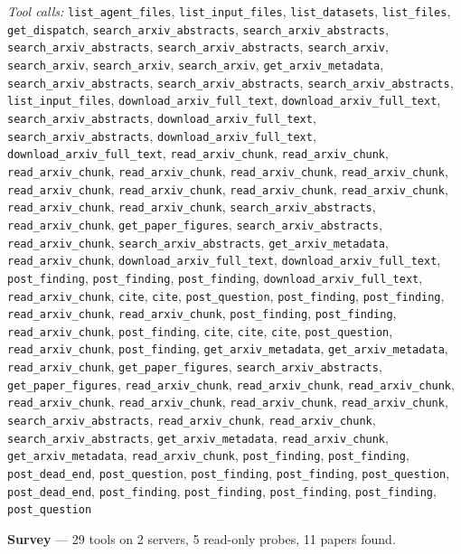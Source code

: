 \documentclass[11pt,a4paper]{article}
\begin{document}
\textit{Tool calls:} \texttt{list\_agent\_files}, \texttt{list\_input\_files}, \texttt{list\_datasets}, \texttt{list\_files}, \texttt{get\_dispatch}, \texttt{search\_arxiv\_abstracts}, \texttt{search\_arxiv\_abstracts}, \texttt{search\_arxiv\_abstracts}, \texttt{search\_arxiv\_abstracts}, \texttt{search\_arxiv}, \texttt{search\_arxiv}, \texttt{search\_arxiv}, \texttt{search\_arxiv}, \texttt{get\_arxiv\_metadata}, \texttt{search\_arxiv\_abstracts}, \texttt{search\_arxiv\_abstracts}, \texttt{search\_arxiv\_abstracts}, \texttt{list\_input\_files}, \texttt{download\_arxiv\_full\_text}, \texttt{download\_arxiv\_full\_text}, \texttt{search\_arxiv\_abstracts}, \texttt{download\_arxiv\_full\_text}, \texttt{search\_arxiv\_abstracts}, \texttt{download\_arxiv\_full\_text}, \texttt{download\_arxiv\_full\_text}, \texttt{read\_arxiv\_chunk}, \texttt{read\_arxiv\_chunk}, \texttt{read\_arxiv\_chunk}, \texttt{read\_arxiv\_chunk}, \texttt{read\_arxiv\_chunk}, \texttt{read\_arxiv\_chunk}, \texttt{read\_arxiv\_chunk}, \texttt{read\_arxiv\_chunk}, \texttt{read\_arxiv\_chunk}, \texttt{read\_arxiv\_chunk}, \texttt{read\_arxiv\_chunk}, \texttt{read\_arxiv\_chunk}, \texttt{search\_arxiv\_abstracts}, \texttt{read\_arxiv\_chunk}, \texttt{get\_paper\_figures}, \texttt{search\_arxiv\_abstracts}, \texttt{read\_arxiv\_chunk}, \texttt{search\_arxiv\_abstracts}, \texttt{get\_arxiv\_metadata}, \texttt{read\_arxiv\_chunk}, \texttt{download\_arxiv\_full\_text}, \texttt{download\_arxiv\_full\_text}, \texttt{post\_finding}, \texttt{post\_finding}, \texttt{post\_finding}, \texttt{download\_arxiv\_full\_text}, \texttt{read\_arxiv\_chunk}, \texttt{cite}, \texttt{cite}, \texttt{post\_question}, \texttt{post\_finding}, \texttt{post\_finding}, \texttt{read\_arxiv\_chunk}, \texttt{read\_arxiv\_chunk}, \texttt{post\_finding}, \texttt{post\_finding}, \texttt{read\_arxiv\_chunk}, \texttt{post\_finding}, \texttt{cite}, \texttt{cite}, \texttt{cite}, \texttt{post\_question}, \texttt{read\_arxiv\_chunk}, \texttt{post\_finding}, \texttt{get\_arxiv\_metadata}, \texttt{get\_arxiv\_metadata}, \texttt{read\_arxiv\_chunk}, \texttt{get\_paper\_figures}, \texttt{search\_arxiv\_abstracts}, \texttt{get\_paper\_figures}, \texttt{read\_arxiv\_chunk}, \texttt{read\_arxiv\_chunk}, \texttt{read\_arxiv\_chunk}, \texttt{read\_arxiv\_chunk}, \texttt{read\_arxiv\_chunk}, \texttt{read\_arxiv\_chunk}, \texttt{read\_arxiv\_chunk}, \texttt{search\_arxiv\_abstracts}, \texttt{read\_arxiv\_chunk}, \texttt{read\_arxiv\_chunk}, \texttt{search\_arxiv\_abstracts}, \texttt{get\_arxiv\_metadata}, \texttt{read\_arxiv\_chunk}, \texttt{get\_arxiv\_metadata}, \texttt{read\_arxiv\_chunk}, \texttt{post\_finding}, \texttt{post\_finding}, \texttt{post\_dead\_end}, \texttt{post\_question}, \texttt{post\_finding}, \texttt{post\_finding}, \texttt{post\_question}, \texttt{post\_dead\_end}, \texttt{post\_finding}, \texttt{post\_finding}, \texttt{post\_finding}, \texttt{post\_finding}, \texttt{post\_question}\par
\textbf{Survey} --- 29 tools on 2 servers, 5 read-only probes, 11 papers found.
\end{document}
